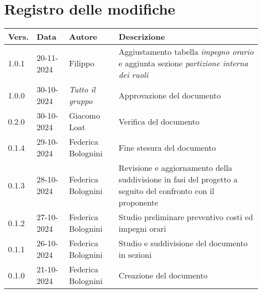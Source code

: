 \section*{Registro delle modifiche}

\begin{table}[h]
    \centering
    \begin{tabular}{|l|l|l|p{5cm}|}
        \hline
        \rowcolor[gray]{0.9}
        \textbf{Vers.} & \textbf{Data} & \textbf{Autore} & \textbf{Descrizione}\\
        \hline
        1.0.1 & 20-11-2024 & Filippo  & Aggiustamento tabella \textit{impegno orario} e aggiunta sezione \textit{partizione interna dei ruoli}\\
        \hline
        1.0.0 & 30-10-2024 & \emph{Tutto il gruppo} & Approvazione del documento\\
        \hline
        0.2.0 & 30-10-2024 & Giacomo Loat & Verifica del documento\\
        \hline
        0.1.4 & 29-10-2024 & Federica Bolognini & Fine stesura del documento\\
        \hline
        0.1.3 & 28-10-2024 & Federica Bolognini & Revisione e aggiornamento della suddivisione in fasi del progetto a seguito del confronto con il proponente\\
        \hline
        0.1.2 & 27-10-2024 & Federica Bolognini & Studio preliminare preventivo costi ed impegni orari\\
        \hline
        0.1.1 & 26-10-2024 & Federica Bolognini & Studio e suddivisione del documento in sezioni\\
        \hline
        0.1.0 & 21-10-2024 & Federica Bolognini & Creazione del documento\\
        \hline
    \end{tabular}
\end{table}
